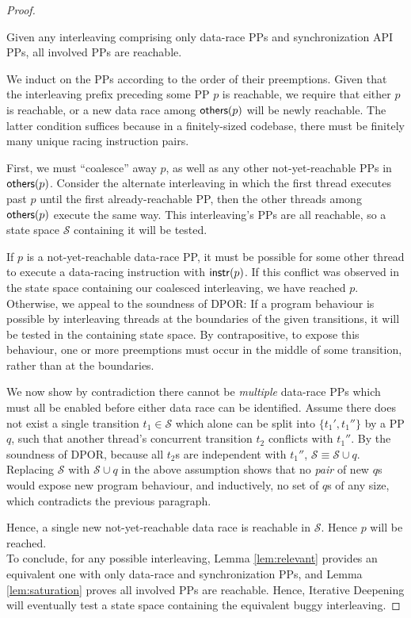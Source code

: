 \begin{proof}
\begin{lemma}
	Given any interleaving comprising only data-race PPs and synchronization API PPs, all involved PPs are reachable.
	\label{lem:saturation}
\end{lemma}

We induct on the PPs according to the order of their preemptions.
Given that the interleaving prefix preceding some PP $p$ is reachable,
we require that either $p$ is reachable, or a new data race among $\mathsf{others}(p)$ will be newly reachable. %
The latter condition suffices because in a finitely-sized codebase, there must be finitely many unique racing instruction pairs.

First, we must ``coalesce'' away $p$, as well as any other not-yet-reachable PPs in $\mathsf{others}(p)$.
Consider the alternate interleaving in which the first thread executes past $p$ until the first already-reachable PP,
then the other threads among $\mathsf{others}(p)$ execute the same way.
This interleaving's PPs are all reachable, so a state space $\mathcal{S}$ containing it will be tested.

If $p$ is a not-yet-reachable data-race PP,
it must be possible for some other thread to execute a data-racing instruction with $\mathsf{instr}(p)$.
If this conflict was observed in the state space containing our coalesced interleaving, we have reached $p$.
Otherwise, we appeal to the soundness of DPOR:
If a program behaviour is possible by interleaving threads at the boundaries of the given transitions,
it will be tested in the containing state space.
By contrapositive, to expose this behaviour, one or more preemptions must occur in the middle of some transition, rather than at the boundaries.

We now show by contradiction there cannot be {\em multiple} data-race PPs which must all be enabled before either data race can be identified.
Assume there does not exist a single transition $t_1 \in \mathcal{S}$ which alone can be split into $\{t_1',t_1''\}$ by a PP $q$,
such that another thread's concurrent transition $t_2$ conflicts with $t_1''$.
By the soundness of DPOR, because all $t_2$s are independent with $t_1''$, $\mathcal{S} \equiv \mathcal{S} \cup q$.
Replacing $\mathcal{S}$ with $\mathcal{S} \cup q$ in the above assumption shows that no {\em pair} of new $q$s would expose new program behaviour, and inductively, no set of $q$s of any size, which contradicts the previous paragraph.

Hence, a single new not-yet-reachable data race is reachable in $\mathcal{S}$. Hence $p$ will be reached.
\\

To conclude,
for any possible interleaving, Lemma \ref{lem:relevant} provides an equivalent one with only data-race and synchronization PPs,
and Lemma \ref{lem:saturation} proves all involved PPs are reachable.
Hence, Iterative Deepening will eventually test a state space containing the equivalent buggy interleaving.
\end{proof}

